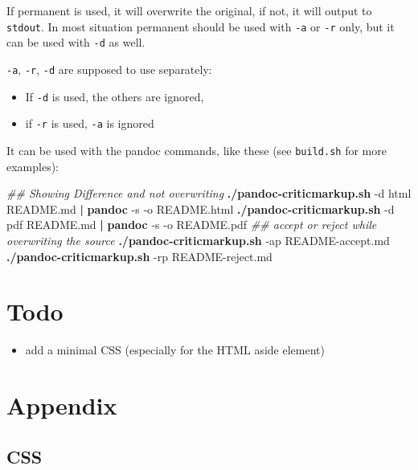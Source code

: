 \documentclass[]{article}
\newenvironment{Shaded}{}{}
\newcommand{\KeywordTok}[1]{\textcolor[rgb]{0.00,0.44,0.13}{\textbf{{#1}}}}
\newcommand{\CommentTok}[1]{\textcolor[rgb]{0.38,0.63,0.69}{\textit{{#1}}}}
\newcommand{\NormalTok}[1]{{#1}}
\providecommand{\tightlist}{%
  \setlength{\itemsep}{0pt}\setlength{\parskip}{0pt}}
\begin{document}
If permanent is used, it will overwrite the original, if not, it will
output to \texttt{stdout}. In most situation permanent should be used
with \texttt{-a} or \texttt{-r} only, but it can be used with
\texttt{-d} as well.

\texttt{-a}, \texttt{-r}, \texttt{-d} are supposed to use separately:

\begin{itemize}
\tightlist
\item
  If \texttt{-d} is used, the others are ignored,
\item
  if \texttt{-r} is used, \texttt{-a} is ignored
\end{itemize}

It can be used with the pandoc commands, like these (see
\texttt{build.sh} for more examples):

\begin{Shaded}
\begin{Highlighting}[]
\CommentTok{## Showing Difference and not overwriting}
\KeywordTok{./pandoc-criticmarkup.sh} \NormalTok{-d html README.md }\KeywordTok{|} \KeywordTok{pandoc} \NormalTok{-s -o README.html}
\KeywordTok{./pandoc-criticmarkup.sh} \NormalTok{-d pdf README.md }\KeywordTok{|} \KeywordTok{pandoc} \NormalTok{-s -o README.pdf}
\CommentTok{## accept or reject while overwriting the source}
\KeywordTok{./pandoc-criticmarkup.sh} \NormalTok{-ap README-accept.md}
\KeywordTok{./pandoc-criticmarkup.sh} \NormalTok{-rp README-reject.md}
\end{Highlighting}
\end{Shaded}

\section{Todo}\label{todo}

\begin{itemize}
\tightlist
\item
  add a minimal CSS (especially for the HTML aside element)
\end{itemize}

\section{Appendix}\label{appendix}

\subsection{CSS}\label{css}
\end{document}
